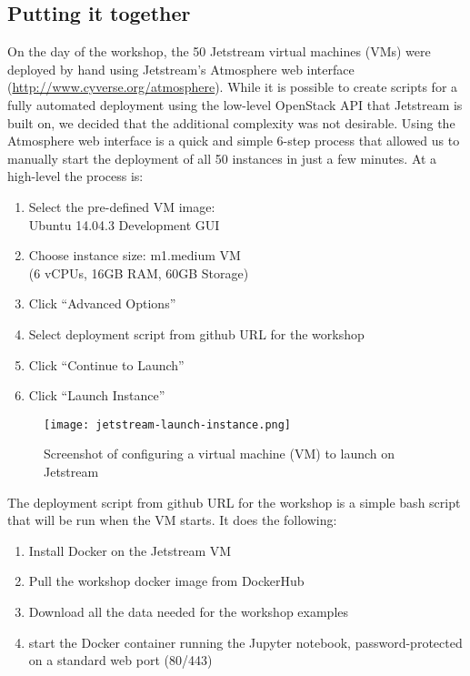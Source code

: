 \subsection{Putting it together}

On the day of the workshop, the 50 Jetstream virtual machines (VMs) were
deployed by hand using Jetstream's Atmosphere\cite{NiravCyberinfra2016} web interface
(\url{http://www.cyverse.org/atmosphere}). While it is possible to create
scripts for a fully automated deployment using the low-level OpenStack API that
Jetstream is built on, we decided that the additional complexity was not
desirable. Using the Atmosphere web interface is a quick and simple 6-step
process that allowed us to manually start the deployment of all 50 instances in
just a few minutes. At a high-level the process is:

\begin{enumerate}
\item Select the pre-defined VM image: \\Ubuntu 14.04.3 Development GUI
\item Choose instance size: m1.medium VM \\(6 vCPUs, 16GB RAM, 60GB
  Storage)
\item Click ``Advanced Options''
\item Select deployment script from github URL for the workshop
\item Click ``Continue to Launch''
\item Click ``Launch Instance''
\end{enumerate}

\begin{figure}[h]
\centering
\texttt{[image: jetstream-launch-instance.png]}
\caption{Screenshot of configuring a virtual machine (VM) to launch on Jetstream}
\end{figure}

The deployment script from github URL for the workshop is a simple bash script
that will be run when the VM starts. It does the following:

\begin{enumerate}
\item Install Docker on the Jetstream VM
\item Pull the workshop docker image from DockerHub
\item Download all the data needed for the workshop examples
\item start the Docker container running the Jupyter notebook, password-protected on a standard web port (80/443)
\end{enumerate}

